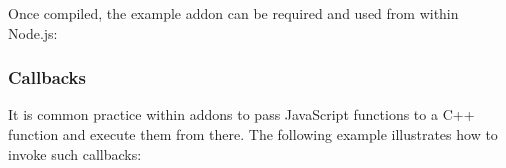 Once compiled, the example addon can be required and used from within
Node.js:

\begin{Shaded}
\begin{Highlighting}[]
\OperatorTok{=} \NormalTok{(}\NormalTok{)}\OperatorTok{;}

\NormalTok{(}\OperatorTok{,}\NormalTok{(}\OperatorTok{,} \NormalTok{))}\OperatorTok{;}
\end{Highlighting}
\end{Shaded}

\subsubsection{Callbacks}\label{callbacks}

It is common practice within addons to pass JavaScript functions to a
C++ function and execute them from there. The following example
illustrates how to invoke such callbacks:

